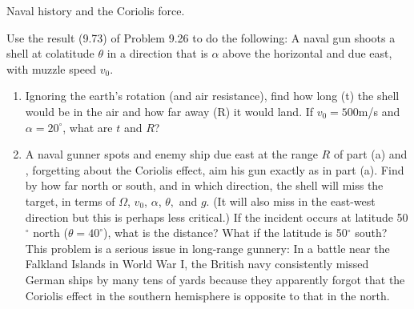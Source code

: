 \documentclass[11pt,letterpaper,boxed]{../hmcpsetrhino}
\begin{document}
\begin{problem}[iii]
Naval history and the Coriolis force.

\begin{problem}[9.28]
Use the result (9.73) of Problem 9.26 to do the following: A naval gun shoots a shell at colatitude $\theta$ in a direction that is $\alpha$ above the horizontal and due east, with muzzle speed $v_0$. 
\begin{enumerate}
\item Ignoring the earth's rotation (and air resistance), find how long (t) the shell would be in the air and how far away (R) it would land. If $v_0 = 500$m/s and $\alpha = 20^{\circ}$, what are $t$ and $R$? 

\item A naval gunner spots and enemy ship due east at the range $R$ of part (a) and , forgetting about the Coriolis effect, aim his gun exactly as in part (a). Find by how far north or south, and in which direction, the shell will miss the target, in terms of $\Omega$, $v_0$, $\alpha$, $\theta,$ and $g$. (It will also miss in the east-west direction but this is perhaps less critical.) If the incident occurs at latitude 50$^\circ$ north ($\theta = 40^\circ$), what is the distance? What if the latitude is 50$^\circ$ south? This problem is a serious issue in long-range gunnery: In a battle near the Falkland Islands in World War I, the British navy consistently missed German ships by many tens of yards because they apparently forgot that the Coriolis effect in the southern hemisphere is opposite to that in the north.
\end{enumerate}
\end{problem}
\end{problem}
\begin{solution}


\vfill
\end{solution}
\end{document}
